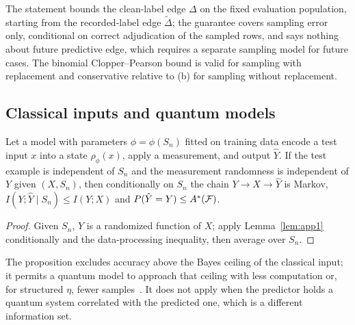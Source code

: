 The statement bounds the clean-label edge $\Delta$ on the fixed evaluation population, starting from the recorded-label edge $\tilde\Delta$; the guarantee covers sampling error only, conditional on correct adjudication of the sampled rows, and says nothing about future predictive edge, which requires a separate sampling model for future cases. The binomial Clopper--Pearson bound is valid for sampling with replacement and conservative relative to (b) for sampling without replacement.

\subsection{Classical inputs and quantum models}
\begin{proposition}\label{prop:appqc}
Let a model with parameters $\phi=\phi(S_n)$ fitted on training data encode a test input $x$ into a state $\rho_\phi(x)$, apply a measurement, and output $\hat Y$. If the test example is independent of $S_n$ and the measurement randomness is independent of $Y$ given $(X,S_n)$, then conditionally on $S_n$ the chain $Y\to X\to\hat Y$ is Markov, $I(Y;\hat Y\mid S_n)\le I(Y;X)$ and $P(\hat Y=Y)\le A^*(\mathcal{F})$.
\end{proposition}
\begin{proof}
Given $S_n$, $\hat Y$ is a randomized function of $X$; apply Lemma~\ref{lem:app1} conditionally and the data-processing inequality, then average over $S_n$.
\end{proof}
The proposition excludes accuracy above the Bayes ceiling of the classical input; it permits a quantum model to approach that ceiling with less computation or, for structured $\eta$, fewer samples~\cite{liu2021rigorous,huang2021information}. It does not apply when the predictor holds a quantum system correlated with the predicted one, which is a different information set.

